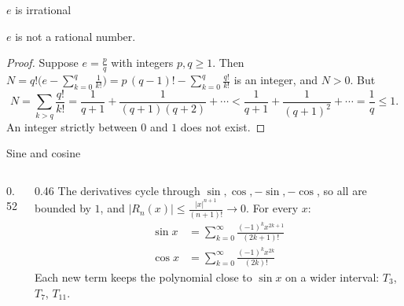 \documentclass{wosm-slides}
\begin{document}
\begin{frame}{$e$ is irrational}
  \begin{theorem}
    $e$ is not a rational number.
  \end{theorem}
  \begin{proof}
    Suppose $e = \frac pq$ with integers $p, q \ge 1$. Then
    $N = q! \bigl( e - \sum_{k=0}^{q} \frac{1}{k!} \bigr) = p\,(q-1)! - \sum_{k=0}^{q} \frac{q!}{k!}$
    is an integer, and $N > 0$. But
    \[ N = \sum_{k > q} \frac{q!}{k!} = \frac{1}{q+1} + \frac{1}{(q+1)(q+2)} + \cdots
       < \frac{1}{q+1} + \frac{1}{(q+1)^2} + \cdots = \frac1q \le 1 . \]
    An integer strictly between $0$ and $1$ does not exist.
  \end{proof}
\end{frame}

\begin{frame}{Sine and cosine}
  \begin{columns}[c]
    \begin{column}{0.52\textwidth}
    \end{column}
    \begin{column}{0.46\textwidth}
      \small
      The derivatives cycle through $\sin, \cos, -\sin, -\cos$, so all are bounded by $1$, and
      $|R_n(x)| \le \frac{|x|^{n+1}}{(n+1)!} \to 0$. For every $x$:
      \begin{align*}
        \sin x &= \sum_{k=0}^\infty \frac{(-1)^k x^{2k+1}}{(2k+1)!} \\
        \cos x &= \sum_{k=0}^\infty \frac{(-1)^k x^{2k}}{(2k)!}
      \end{align*}
      Each new term keeps the polynomial close to $\sin x$ on a wider interval:
      {\color{wosm-brick!50!wosm-bg}$T_3$}, {\color{wosm-brick!80!wosm-bg}$T_7$},
      {\color{wosm-accent}$T_{11}$}.
    \end{column}
  \end{columns}
\end{frame}
\end{document}
